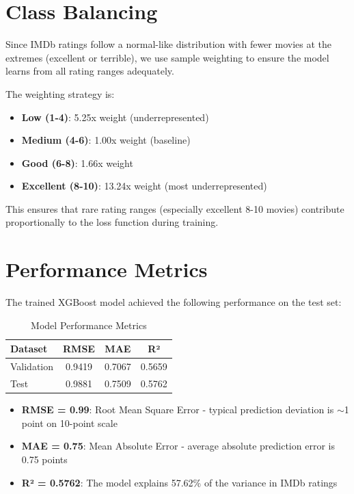 \section{Class Balancing}

Since IMDb ratings follow a normal-like distribution with fewer movies at the extremes (excellent or terrible), we use sample weighting to ensure the model learns from all rating ranges adequately.

The weighting strategy is:
\begin{itemize}
    \item \textbf{Low (1-4)}: 5.25x weight (underrepresented)
    \item \textbf{Medium (4-6)}: 1.00x weight (baseline)
    \item \textbf{Good (6-8)}: 1.66x weight
    \item \textbf{Excellent (8-10)}: 13.24x weight (most underrepresented)
\end{itemize}

This ensures that rare rating ranges (especially excellent 8-10 movies) contribute proportionally to the loss function during training.

\section{Performance Metrics}

The trained XGBoost model achieved the following performance on the test set:

\begin{table}[h]
\centering
\begin{tabular}{lccc}
\toprule
\textbf{Dataset} & \textbf{RMSE} & \textbf{MAE} & \textbf{R²} \\
\midrule
Validation & 0.9419 & 0.7067 & 0.5659 \\
Test & 0.9881 & 0.7509 & 0.5762 \\
\bottomrule
\end{tabular}
\caption{Model Performance Metrics}
\label{tab:algo_performance}
\end{table}

\begin{itemize}
    \item \textbf{RMSE = 0.99}: Root Mean Square Error - typical prediction deviation is $\sim$1 point on 10-point scale
    \item \textbf{MAE = 0.75}: Mean Absolute Error - average absolute prediction error is 0.75 points
    \item \textbf{R² = 0.5762}: The model explains 57.62\% of the variance in IMDb ratings
\end{itemize}

